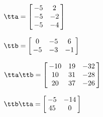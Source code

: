 {$\tta = \left[\hskip -3pt \begin{array}{cc} -5&2\\  -5&-2
\\  -5&-4\end{array}\hskip -3pt \right]$ 

$\ttb = \left[\hskip -3pt \begin{array}{ccc} 0&-5&6\\  -5&-3&-1
\end{array}\hskip -3pt \right] $}
{$\tta\ttb = \left[\hskip -3pt \begin{array}{ccc} -10&19&-32\\  10&31&-28
\\  20&37&-26\end{array}\hskip -3pt \right] $

$\ttb\tta = \left[\hskip -3pt \begin{array}{cc} -5&-14\\  45&0\end{array}\hskip -3pt \right] $}

